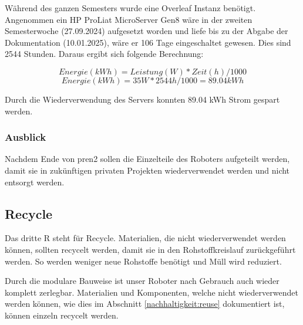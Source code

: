 Während des ganzen Semesters wurde eine Overleaf Instanz benötigt. Angenommen ein HP ProLiat MicroServer Gen8 wäre in der zweiten Semesterwoche (27.09.2024) aufgesetzt worden und liefe bis zu der Abgabe der Dokumentation (10.01.2025), wäre er 106 Tage eingeschaltet gewesen.
Dies sind 2544 Stunden. Daraus ergibt sich folgende Berechnung:

\[Energie(kWh)=Leistung(W) * Zeit(h) / 1000\]
\[Energie(kWh)=35W * 2544h / 1000 = 89.04kWh\]

 Durch die Wiederverwendung des Servers konnten 89.04 kWh Strom gespart werden.

 
\subsubsection{Ausblick}

Nachdem Ende von \acrshort{pren2} sollen die Einzelteile des Roboters aufgeteilt werden, damit sie in zukünftigen privaten Projekten wiederverwendet werden und nicht entsorgt werden.



\subsection{Recycle}

Das dritte R steht für Recycle. Materialien, die nicht wiederverwendet werden können, sollten recycelt werden, damit sie in den Rohstoffkreislauf zurückgeführt werden. So werden weniger neue Rohstoffe benötigt und Müll wird reduziert.

Durch die modulare Bauweise ist unser Roboter nach Gebrauch auch wieder komplett zerlegbar. Materialien und Komponenten, welche nicht wiederverwendet werden können, wie dies im Abschnitt \ref{nachhaltigkeit:reuse} dokumentiert ist, können einzeln recycelt werden.




